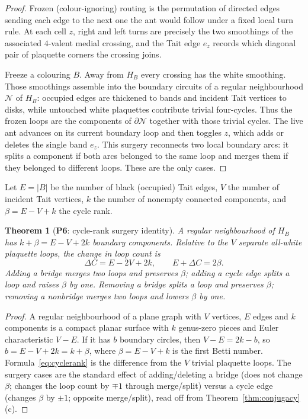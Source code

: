 \documentclass[11pt,reqno]{amsart}
\theoremstyle{plain}
\newtheorem{theorem}{Theorem}[section]
\theoremstyle{definition}
\newcommand{\PN}[1]{\textbf{P#1}}
\begin{document}
\begin{proof}
Frozen (colour-ignoring) routing is the permutation of directed edges sending each
edge to the next one the ant would follow under a fixed local turn rule. At each
cell $z$, right and left turns are precisely the two smoothings of the associated
$4$-valent medial crossing, and the Tait edge $e_z$ records which diagonal pair of
plaquette corners the crossing joins.

Freeze a colouring $B$. Away from $H_B$ every crossing has the white smoothing.
Those smoothings assemble into the boundary circuits of a regular neighbourhood
$\mathcal N$ of $H_B$: occupied edges are thickened to bands and incident Tait
vertices to disks, while untouched white plaquettes contribute trivial four-cycles.
Thus the frozen loops are the components of $\partial\mathcal N$ together with those
trivial cycles. The live ant advances on its current boundary loop and then toggles
$z$, which adds or deletes the single band $e_z$. This surgery reconnects two local
boundary arcs: it splits a component if both arcs belonged to the same loop and
merges them if they belonged to different loops. These are the only cases.
\end{proof}

Let $E=|B|$ be the number of black (occupied) Tait edges, $V$ the number of
incident Tait vertices, $k$ the number of nonempty connected components, and
$\beta=E-V+k$ the cycle rank.

\begin{theorem}[\PN{6}: cycle-rank surgery identity]\label{thm:cyclerank}
A regular neighbourhood of $H_B$ has $k+\beta=E-V+2k$ boundary components.
Relative to the $V$ separate all-white plaquette loops, the change in loop count
is
\begin{equation}\label{eq:cyclerank}
\Delta C=E-2V+2k,\qquad E+\Delta C=2\beta .
\end{equation}
Adding a bridge merges two loops and preserves $\beta$; adding a cycle edge
splits a loop and raises $\beta$ by one. Removing a bridge splits a loop and
preserves $\beta$; removing a nonbridge merges two loops and lowers $\beta$ by
one.
\end{theorem}

\begin{proof}
A regular neighbourhood of a plane graph with $V$ vertices, $E$ edges and $k$
components is a compact planar surface with $k$ genus-zero pieces and Euler
characteristic $V-E$. If it has $b$ boundary circles, then $V-E=2k-b$, so
$b=E-V+2k=k+\beta$, where $\beta=E-V+k$ is the first Betti number.
Formula~\eqref{eq:cyclerank} is the difference from the $V$ trivial plaquette
loops. The surgery cases are the standard effect of adding/deleting a bridge
(does not change $\beta$; changes the loop count by $\mp1$ through
merge/split) versus a cycle edge (changes $\beta$ by $\pm1$; opposite
merge/split), read off from Theorem~\ref{thm:conjugacy}(c).
\end{proof}
\end{document}
